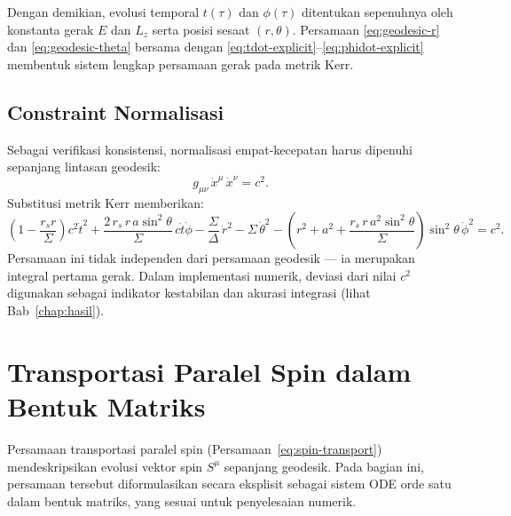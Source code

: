 Dengan demikian, evolusi temporal $t(\tau)$ dan $\phi(\tau)$
ditentukan sepenuhnya oleh konstanta gerak $E$ dan $L_z$
serta posisi sesaat $(r, \theta)$.
Persamaan \eqref{eq:geodesic-r} dan \eqref{eq:geodesic-theta}
bersama dengan \eqref{eq:tdot-explicit}--\eqref{eq:phidot-explicit}
membentuk sistem lengkap persamaan gerak pada metrik Kerr.


\subsection{Constraint Normalisasi}
\label{subsec:constraint}

Sebagai verifikasi konsistensi, normalisasi empat-kecepatan harus dipenuhi
sepanjang lintasan geodesik:
\begin{equation}
    g_{\mu\nu}\,\dot{x}^\mu\,\dot{x}^\nu = c^2.
    \label{eq:norm-constraint}
\end{equation}
Substitusi metrik Kerr memberikan:
\begin{equation}
    \left(1 - \frac{r_s r}{\Sigma}\right) c^2\dot{t}^2
    + \frac{2\,r_s\, r\, a\sin^2\!\theta}{\Sigma}\, c\dot{t}\dot{\phi}
    - \frac{\Sigma}{\Delta}\,\dot{r}^2
    - \Sigma\,\dot{\theta}^2
    - \left(r^2 + a^2 + \frac{r_s\, r\, a^2\sin^2\!\theta}{\Sigma}\right)
      \sin^2\!\theta\,\dot{\phi}^2 = c^2.
    \label{eq:norm-explicit}
\end{equation}
Persamaan ini tidak independen dari persamaan geodesik ---
ia merupakan integral pertama gerak.
Dalam implementasi numerik, deviasi dari nilai $c^2$ digunakan
sebagai indikator kestabilan dan akurasi integrasi
(lihat Bab~\ref{chap:hasil}).



\section{Transportasi Paralel Spin dalam Bentuk Matriks}
\label{sec:spin-matriks}

Persamaan transportasi paralel spin (Persamaan~\ref{eq:spin-transport})
mendeskripsikan evolusi vektor spin $S^\mu$ sepanjang geodesik.
Pada bagian ini, persamaan tersebut diformulasikan secara eksplisit
sebagai sistem ODE orde satu dalam bentuk matriks,
yang sesuai untuk penyelesaian numerik.


